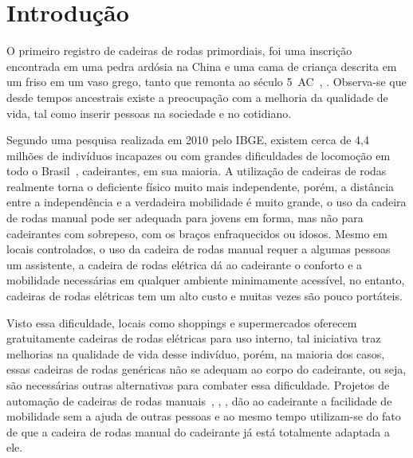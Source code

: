 \chapter[Introdução]{Introdução}

O primeiro registro de cadeiras de rodas primordiais, foi uma inscrição encontrada em uma pedra ardósia na China e uma cama de criança descrita em um friso em um vaso grego, tanto que remonta ao século 5~AC~\cite{joseph:puttingthewhee:2012}, \cite{maggie:whoinvented:2012}. Observa-se que desde tempos ancestrais existe a preocupação com a melhoria da qualidade de vida, tal como inserir pessoas na sociedade e no cotidiano. 

Segundo uma pesquisa realizada em 2010 pelo IBGE, existem cerca de 4,4 milhões de indivíduos incapazes ou com grandes dificuldades de locomoção em todo o Brasil~\cite{ibge:cartilha:2010}, cadeirantes, em sua maioria. A utilização de cadeiras de rodas realmente torna o deficiente físico muito mais independente, porém, a distância entre a independência e a verdadeira mobilidade é muito grande, o uso da cadeira de rodas manual pode ser adequada para jovens em forma, mas não para cadeirantes com sobrepeso, com os braços enfraquecidos ou idosos. Mesmo em locais controlados, o uso da cadeira de rodas manual requer a algumas pessoas um assistente, a cadeira de rodas elétrica dá ao cadeirante o conforto e a mobilidade necessárias em qualquer ambiente minimamente acessível, no entanto, cadeiras de rodas elétricas tem um alto custo e muitas vezes são pouco portáteis.

Visto essa dificuldade, locais como shoppings e supermercados oferecem gratuitamente cadeiras de rodas elétricas para uso interno, tal iniciativa traz melhorias na qualidade de vida desse indivíduo, porém, na maioria dos casos, essas cadeiras de rodas genéricas não se adequam ao corpo do cadeirante, ou seja, são necessárias outras alternativas para combater essa dificuldade. Projetos de automação de cadeiras de rodas manuais~\cite{brunel:wheelchair:2004}, \cite{artigo_rudi}, \cite{patent_cadeira_rodas_eletrica},	 \cite{marcos:controle:2002} dão ao cadeirante a facilidade de mobilidade sem a ajuda de outras pessoas e ao mesmo tempo utilizam-se do fato de que a cadeira de rodas manual do cadeirante já está totalmente adaptada a ele.

